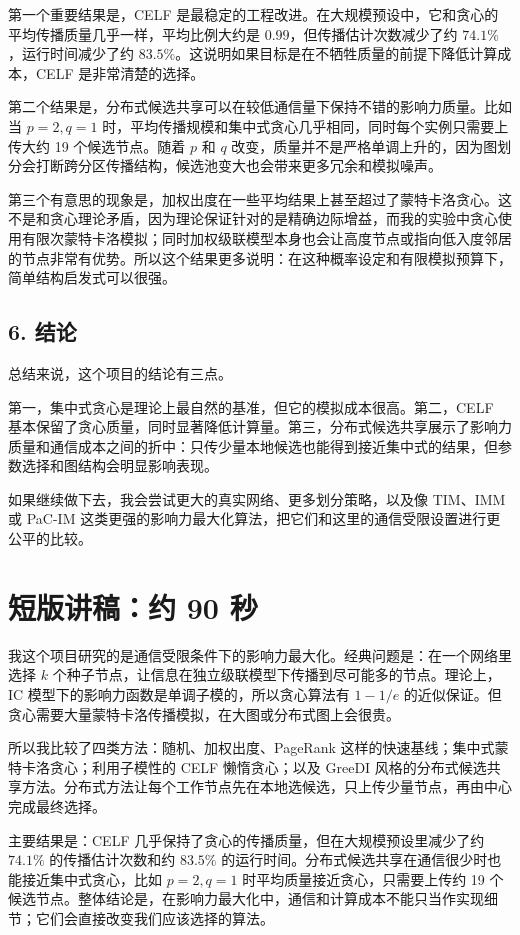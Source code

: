 \documentclass[11pt]{ctexart}
\begin{document}
第一个重要结果是，CELF 是最稳定的工程改进。在大规模预设中，它和贪心的平均传播质量几乎一样，平均比例大约是 $0.99$，但传播估计次数减少了约 $74.1\%$，运行时间减少了约 $83.5\%$。这说明如果目标是在不牺牲质量的前提下降低计算成本，CELF 是非常清楚的选择。

第二个结果是，分布式候选共享可以在较低通信量下保持不错的影响力质量。比如当 $p=2,q=1$ 时，平均传播规模和集中式贪心几乎相同，同时每个实例只需要上传大约 19 个候选节点。随着 $p$ 和 $q$ 改变，质量并不是严格单调上升的，因为图划分会打断跨分区传播结构，候选池变大也会带来更多冗余和模拟噪声。

第三个有意思的现象是，加权出度在一些平均结果上甚至超过了蒙特卡洛贪心。这不是和贪心理论矛盾，因为理论保证针对的是精确边际增益，而我的实验中贪心使用有限次蒙特卡洛模拟；同时加权级联模型本身也会让高度节点或指向低入度邻居的节点非常有优势。所以这个结果更多说明：在这种概率设定和有限模拟预算下，简单结构启发式可以很强。

\subsection*{6. 结论}

总结来说，这个项目的结论有三点。

第一，集中式贪心是理论上最自然的基准，但它的模拟成本很高。第二，CELF 基本保留了贪心质量，同时显著降低计算量。第三，分布式候选共享展示了影响力质量和通信成本之间的折中：只传少量本地候选也能得到接近集中式的结果，但参数选择和图结构会明显影响表现。

如果继续做下去，我会尝试更大的真实网络、更多划分策略，以及像 TIM、IMM 或 PaC-IM 这类更强的影响力最大化算法，把它们和这里的通信受限设置进行更公平的比较。

\section*{短版讲稿：约 90 秒}

我这个项目研究的是通信受限条件下的影响力最大化。经典问题是：在一个网络里选择 $k$ 个种子节点，让信息在独立级联模型下传播到尽可能多的节点。理论上，IC 模型下的影响力函数是单调子模的，所以贪心算法有 $1-1/e$ 的近似保证。但贪心需要大量蒙特卡洛传播模拟，在大图或分布式图上会很贵。

所以我比较了四类方法：随机、加权出度、PageRank 这样的快速基线；集中式蒙特卡洛贪心；利用子模性的 CELF 懒惰贪心；以及 GreeDI 风格的分布式候选共享方法。分布式方法让每个工作节点先在本地选候选，只上传少量节点，再由中心完成最终选择。

主要结果是：CELF 几乎保持了贪心的传播质量，但在大规模预设里减少了约 $74.1\%$ 的传播估计次数和约 $83.5\%$ 的运行时间。分布式候选共享在通信很少时也能接近集中式贪心，比如 $p=2,q=1$ 时平均质量接近贪心，只需要上传约 19 个候选节点。整体结论是，在影响力最大化中，通信和计算成本不能只当作实现细节；它们会直接改变我们应该选择的算法。
\end{document}
